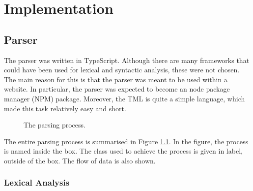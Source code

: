 \chapter{Implementation}
\section{Parser}

The parser was written in TypeScript. Although there are many frameworks that could have been used for lexical and syntactic analysis, these were not chosen. The main reason for this is that the parser was meant to be used within a website. In particular, the parser was expected to become an node package manager (NPM) package. Moreover, the TML is quite a simple language, which made this task relatively easy and short.

\begin{figure}[htb]
    \centering
    \caption{The parsing process.}
    \label{fig:parsing_process}
\end{figure}

The entire parsing process is summarised in Figure \ref{fig:parsing_process}. In the figure, the process is named inside the box. The class used to achieve the process is given in label, outside of the box. The flow of data is also shown.

\subsection{Lexical Analysis}

